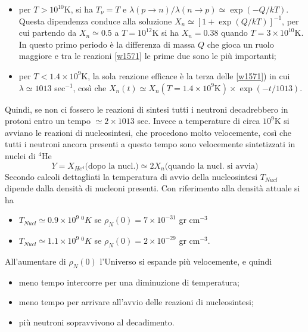 \begin{itemize}
\item per $T>10^{10}$K, si ha $T_{\nu}=T$ e $\lambda(p\to n)/\lambda(n\to p)
  \simeq \exp(-Q/kT)$.  Questa dipendenza conduce alla soluzione $X_n \simeq
  [1+\exp (Q/kT)]^{-1}$, per cui partendo da $X_n \simeq 0.5$ a $T= 10^{12}$K si
  ha $X_n=0.38$ quando $T= 3 \times 10^{10}$K.  In questo primo periodo è la
  differenza di massa $Q$ che gioca un ruolo maggiore e tra le reazioni
  \eqref{w1571} le prime due sono le più importanti;
\item per $T<1.4 \times 10^{9}$K, la sola reazione efficace è la terza delle
  \eqref{w1571}) in cui $\lambda \simeq 1013$ sec$^{-1}$, così che
  $X_n(t) \simeq X_n(T=1.4 \times 10^{9}\text{K}) \times  \exp(-t/1013)$. \\
\end{itemize}
Quindi, se non ci fossero le reazioni di sintesi tutti i neutroni decadrebbero
in protoni entro un tempo $\simeq 2 \times 1013$ sec.  Invece a temperature di
circa $10^9$K si avviano le reazioni di nucleosintesi, che procedono molto
velocemente, così che tutti i neutroni ancora presenti a questo tempo sono
velocemente sintetizzati in nuclei di $^4$He
\begin{equation}
  Y = X_{He^4} \text{(dopo la nucl.)} \simeq 2X_n \text{(quando la nucl. si
    avvia)}
\end{equation}
Secondo calcoli dettagliati la temperatura di avvio della nucleosintesi
$T_{Nucl}$ dipende dalla densità di nucleoni presenti.  Con riferimento alla
densità attuale si ha
\begin{itemize}
\item $T_{Nucl} \simeq 0.9 \times 10^9~^0K$ se $\rho_N(0) = 7 \times 10^{-31}$
  gr cm$^{-3}$
\item $T_{Nucl} \simeq 1.1 \times 10^9~^0K$ se $\rho_N(0) = 2 \times 10^{-29}$
  gr cm$^{-3}$.
\end{itemize}
All'aumentare di $\rho_N(0)$ l'Universo si espande più velocemente, e quindi
\begin{itemize}
\item meno tempo intercorre per una diminuzione di temperatura;
\item meno tempo per arrivare all'avvio delle reazioni di nucleosintesi;
\item più neutroni sopravvivono al decadimento.
\end{itemize}

